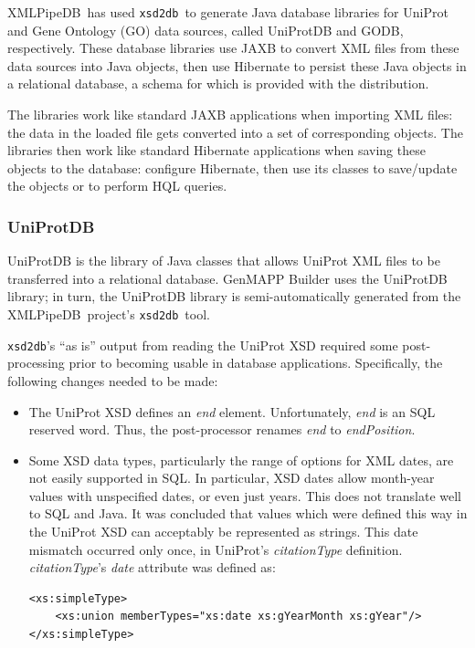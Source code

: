 \documentclass[10pt]{bmc_article}
\newenvironment{bmcformat}{\begin{raggedright}\baselineskip20pt\sloppy\setboolean{publ}{false}}{\end{raggedright}\baselineskip20pt\sloppy}
\def\xmlpipedb{XMLPipeDB}                       %
\def\xsd2db{\texttt{xsd2db}}
\begin{document}
\begin{bmcformat}
\xmlpipedb\ has used \xsd2db\ to generate Java database libraries for UniProt and Gene Ontology (GO) data sources, called UniProtDB and GODB, respectively.  These database libraries use JAXB to convert XML files from these data sources into Java objects, then use Hibernate to persist these Java objects in a relational database, a schema for which is provided with the distribution.\pb

The libraries work like standard JAXB applications when importing XML files: the data in the loaded file gets converted into a set of corresponding objects.  The libraries then work like standard Hibernate applications when saving these objects to the database: configure Hibernate, then use its classes to save/update the objects or to perform HQL queries.\pb

\subsubsection*{UniProtDB}

UniProtDB is the library of Java classes that allows UniProt XML files to be transferred into a relational database.  GenMAPP Builder uses the UniProtDB library; in turn, the UniProtDB library is semi-automatically generated from the \xmlpipedb\ project's \xsd2db\ tool.\pb

\xsd2db's ``as is'' output from reading the UniProt XSD \cite{uniprotxsd} required some post-processing prior to becoming usable in database applications.  Specifically, the following changes needed to be made:
\begin{itemize}
\item The UniProt XSD defines an \textsl{end} element.  Unfortunately, \textsl{end} is an SQL reserved word.  Thus, the post-processor renames \textsl{end} to \textsl{endPosition}.

\item Some XSD data types, particularly the range of options for XML dates, are not easily supported in SQL.  In particular, XSD dates allow month-year values with unspecified dates, or even just years.  This does not translate well to SQL and Java.  It was concluded that values which were defined this way in the UniProt XSD can acceptably be represented as strings.  This date mismatch occurred only once, in UniProt's \textsl{citationType} definition.  \textsl{citationType}'s \textsl{date} attribute was defined as:

\begin{verbatim}
<xs:simpleType>
    <xs:union memberTypes="xs:date xs:gYearMonth xs:gYear"/>
</xs:simpleType>
\end{verbatim}


\end{itemize}
\end{bmcformat}
\end{document}

